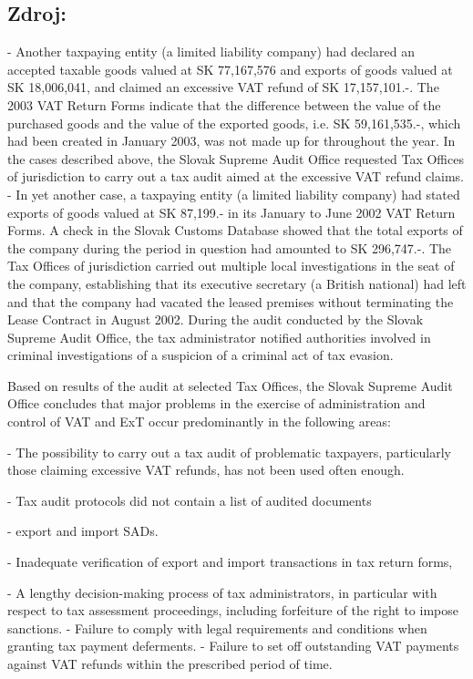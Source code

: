 \documentclass[10pt]{article}
\begin{document}
\subsection*{Zdroj:}

- Another taxpaying entity (a limited liability company) had declared an accepted taxable goods valued at SK 77,167,576 and exports of goods valued at SK 18,006,041, and claimed an excessive VAT refund of SK 17,157,101.-.
The 2003 VAT Return Forms indicate that the difference between the value of the purchased goods and the value of the exported goods, i.e. SK 59,161,535.-, which had been created in January 2003, was not made up for throughout the year.
In the cases described above, the Slovak Supreme Audit Office requested Tax Offices of jurisdiction to carry out a tax audit aimed at the excessive VAT refund claims.
- In yet another case, a taxpaying entity (a limited liability company) had stated exports of goods valued at SK 87,199.- in its January to June 2002 VAT Return Forms.
A check in the Slovak Customs Database showed that the total exports of the company during the period in question had amounted to SK 296,747.-.
The Tax Offices of jurisdiction carried out multiple local investigations in the seat of the company, establishing that its executive secretary (a British national) had left and that the company had vacated the leased premises without terminating the Lease Contract in August 2002.
During the audit conducted by the Slovak Supreme Audit Office, the tax administrator notified authorities involved in criminal investigations of a suspicion of a criminal act of tax evasion.


Based on results of the audit at selected Tax Offices, the Slovak Supreme Audit Office concludes that major problems in the exercise of administration and control of VAT and ExT occur predominantly in the following areas:

- The possibility to carry out a tax audit of problematic taxpayers, particularly those claiming excessive VAT refunds, has not been used often enough.


- Tax audit protocols did not contain a list of audited documents

- export and import SADs.


- Inadequate verification of export and import transactions in tax return forms,

- A lengthy decision-making process of tax administrators, in particular with respect to tax assessment proceedings, including forfeiture of the right to impose sanctions.
- Failure to comply with legal requirements and conditions when granting tax payment deferments.
- Failure to set off outstanding VAT payments against VAT refunds within the prescribed period of time.
\end{document}
